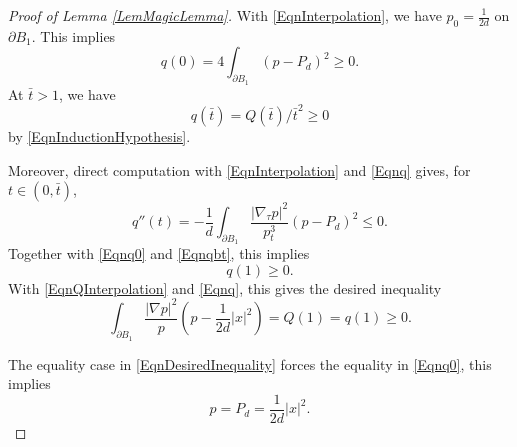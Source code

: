 \documentclass[10pt,a4paper]{amsart}
\def\PB{\partial B_1}
\begin{document}
\begin{proof}[Proof of Lemma \ref{LemMagicLemma}]
With \eqref{EqnInterpolation}, we have $p_0=\frac{1}{2d}$ on $\PB$. This implies
\begin{equation}
\label{Eqnq0}
q(0)=4\int_{\partial B_1}(p-P_d)^2\ge0.
\end{equation}
At $\bar t>1$, we have
\begin{equation}
\label{Eqnqbt}
q(\bar t)=Q(\bar t)/\bar{t}^2\ge0
\end{equation}
by \eqref{EqnInductionHypothesis}.

Moreover, direct computation with \eqref{EqnInterpolation} and \eqref{Eqnq} gives, for $t\in(0,\bar t)$,
$$
q''(t)=-\frac{1}{d}\int_{\PB}\frac{|\nabla_\tau p|^2}{p_t^3}(p-P_d)^2\le 0.
$$
Together with \eqref{Eqnq0} and \eqref{Eqnqbt}, this implies 
$$q(1)\ge0.$$
With \eqref{EqnQInterpolation} and \eqref{Eqnq}, this gives the desired inequality 
\begin{equation}
\label{EqnDesiredInequality}
\int_{\PB}\frac{|\nabla p|^2}{p}(p-\frac{1}{2d}|x|^2)=Q(1)=q(1)\ge0.
\end{equation}

The equality case in \eqref{EqnDesiredInequality} forces the equality in \eqref{Eqnq0}, this implies
$$
p=P_d=\frac{1}{2d}|x|^2.
$$
\end{proof} 
\end{document}
